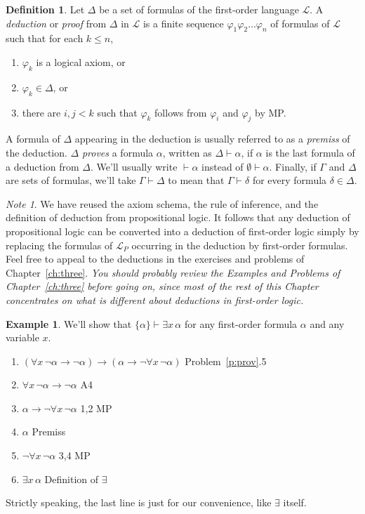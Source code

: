 \documentclass[12pt]{amsbook}
\newcommand{\proves}{\vdash}
\theoremstyle{plain}
\theoremstyle{definition}
\newtheorem{defn}{Definition}[chapter]
\newtheorem{exmp}{Example}[chapter]
\theoremstyle{remark}
\newtheorem*{note}{Note}             %
\begin{document}
\begin{defn}  
Let $\Delta$ be a set of formulas of the first-order language $\mathcal{L}$.  A {\em deduction\/} or {\em proof\/} from $\Delta$ in $\mathcal{L}$ is a finite sequence $\varphi_1 \varphi_2 \dots \varphi_n$ of formulas of $\mathcal{L}$ such that for each $k \le n$,
\begin{enumerate}
\item $\varphi_k$ is a logical axiom,  or
\item $\varphi_k \in \Delta$,  or
\item there are $i,j < k$ such that $\varphi_k$ follows from $\varphi_i$ and $\varphi_j$ by MP.
\end{enumerate}
A formula of $\Delta$ appearing in the deduction is usually referred to as a {\em premiss\/} of the deduction.  $\Delta$ {\em proves\/} a formula $\alpha$,  written as $\Delta \proves \alpha$,\index{$\proves$}  if $\alpha$ is the last formula of a deduction from $\Delta$.  We'll usually write $\proves \alpha$ instead of $\emptyset \proves \alpha$.  Finally,  if $\Gamma$ and $\Delta$ are sets of formulas,  we'll take $\Gamma \proves \Delta$ to mean that $\Gamma \proves \delta$ for every formula $\delta \in \Delta$.  
\end{defn}

\begin{note}
We have reused the axiom schema,  the rule of inference,  and the definition of deduction from propositional logic.  It follows that any deduction of propositional logic can be converted into a deduction of first-order logic simply by replacing the formulas of $\mathcal{L}_P$ occurring in the deduction by first-order formulas.  Feel free to appeal to the deductions in the exercises and problems of Chapter~\ref{ch:three}.  {\em You should probably review the Examples and Problems of Chapter~\ref{ch:three} before going on,  since most of the rest of this Chapter concentrates on what is {\em different\/} about deductions in first-order logic.\/}
\end{note}

\begin{exmp} \label{e:apf}
We'll show that  $\{ \alpha \} \proves \exists x\, \alpha$ for any first-order formula $\alpha$ and any variable $x$.
\begin{enumerate}
\item $(\forall x\, \lnot\alpha \to \lnot\alpha) \to (\alpha \to \lnot \forall x\, \lnot \alpha)$ \hfill Problem~\ref{p:prov}.5
\item $\forall x\, \lnot\alpha \to \lnot\alpha$ \hfill A4
\item $\alpha \to \lnot \forall x\, \lnot \alpha$ \hfill 1,2 MP
\item $\alpha$ \hfill Premiss
\item $\lnot \forall x\, \lnot \alpha$ \hfill 3,4 MP
\item $\exists x\, \alpha$ \hfill Definition of $\exists$
\end{enumerate}
Strictly speaking,  the last line is just for our convenience,  like $\exists$ itself.
\end{exmp}
\end{document}
